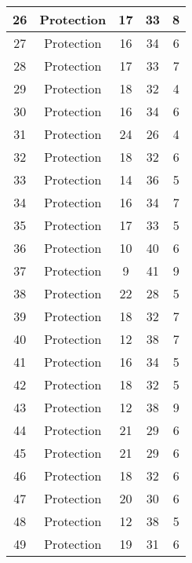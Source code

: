 \documentclass[results.tex]{subfiles}
\begin{document}
\begin{center}
\begin{tabular}{| c || c | c | c | c |}
    \hline
    26 & Protection & 17 & 33 & 8 \\ 
    \hline
    27 & Protection & 16 & 34 & 6 \\ 
    \hline
    28 & Protection & 17 & 33 & 7 \\ 
    \hline
    29 & Protection & 18 & 32 & 4 \\ 
    \hline
    30 & Protection & 16 & 34 & 6 \\ 
    \hline
    31 & Protection & 24 & 26 & 4 \\ 
    \hline
    32 & Protection & 18 & 32 & 6 \\ 
    \hline
    33 & Protection & 14 & 36 & 5 \\ 
    \hline
    34 & Protection & 16 & 34 & 7 \\ 
    \hline
    35 & Protection & 17 & 33 & 5 \\ 
    \hline
    36 & Protection & 10 & 40 & 6 \\ 
    \hline
    37 & Protection & 9 & 41 & 9 \\ 
    \hline
    38 & Protection & 22 & 28 & 5 \\ 
    \hline
    39 & Protection & 18 & 32 & 7 \\ 
    \hline
    40 & Protection & 12 & 38 & 7 \\ 
    \hline
    41 & Protection & 16 & 34 & 5 \\ 
    \hline
    42 & Protection & 18 & 32 & 5 \\ 
    \hline
    43 & Protection & 12 & 38 & 9 \\ 
    \hline
    44 & Protection & 21 & 29 & 6 \\ 
    \hline
    45 & Protection & 21 & 29 & 6 \\ 
    \hline
    46 & Protection & 18 & 32 & 6 \\ 
    \hline
    47 & Protection & 20 & 30 & 6 \\ 
    \hline
    48 & Protection & 12 & 38 & 5 \\ 
    \hline
    49 & Protection & 19 & 31 & 6 \\ 
    \hline   \end{tabular}
\end{center}
\end{document}
